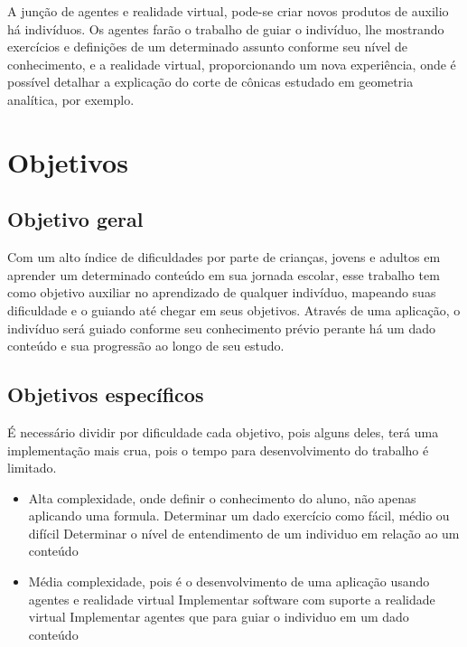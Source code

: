 \documentclass[12pt]{article}
\begin{document}
    A junção de agentes e realidade virtual, pode-se criar novos produtos de auxilio há indivíduos. Os agentes farão o trabalho de guiar o indivíduo, lhe mostrando exercícios e definições de um determinado assunto conforme seu nível de conhecimento, e a realidade virtual, proporcionando um nova experiência, onde é possível detalhar a explicação do corte de cônicas estudado em geometria analítica, por exemplo.

\newpage
\section{Objetivos}

\subsection{Objetivo geral}

   \hspace*{5mm}Com um alto índice de dificuldades por parte de crianças, jovens e adultos em aprender um determinado conteúdo em sua jornada escolar, esse trabalho tem como objetivo auxiliar no aprendizado de qualquer indivíduo, mapeando suas dificuldade e o guiando até chegar em seus objetivos. Através de uma aplicação, o indivíduo será guiado conforme seu conhecimento prévio perante há um dado conteúdo e sua progressão ao longo de seu estudo.
\subsection{Objetivos específicos}
    \hspace*{5mm}
    
    É necessário dividir por dificuldade cada objetivo, pois alguns deles, terá uma implementação mais crua, pois o tempo para desenvolvimento do trabalho é limitado.


    \begin{itemize}
        \item Alta complexidade, onde definir o conhecimento do aluno, não apenas aplicando uma formula.
        \subitem Determinar um dado exercício como fácil, médio ou difícil
        \subitem Determinar o nível de entendimento de um individuo em relação ao um conteúdo
        \item Média complexidade, pois é o desenvolvimento de uma aplicação usando agentes e realidade virtual
        \subitem Implementar software com suporte a realidade virtual
        \subitem Implementar agentes que para guiar o individuo em um dado conteúdo
    \end{itemize}
\end{document}
